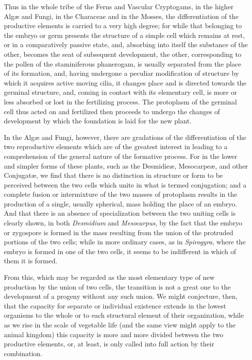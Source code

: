 \documentclass[a4paper, 11pt, oneside, english]{article}
\begin{document}
Thus in the whole tribe of the Ferns and Vascular Cryptogams, in the higher Algæ and Fungi, in the Characeae and in the Mosses, the differentiation of the productive elements is carried to a very high degree; for while that belonging to the embryo or germ presents the structure of a simple cell which remains at rest, or in a comparatively passive state, and, absorbing into itself the substance of the other, becomes the seat of subsequent development, the other, corresponding to the pollen of the staminiferous phanerogam, is usually separated from the place of its formation, and, having undergone a peculiar modification of structure by which it acquires active moving cilia, it changes place and is directed towards the germinal structure, and, coming in contact with its elementary cell, is more or less absorbed or lost in the fertilizing process. The protoplasm of the germinal cell thus acted on and fertilized then proceeds to undergo the changes of development by which the foundation is laid for the new plant.

In the Algæ and Fungi, however, there are gradations of the differentiation of the two reproductive elements which are of the greatest interest in leading to a comprehension of the general nature of the formative process. For in the lower and simpler forms of these plants, such as the Desmidieæ, Mesocarpeæ, and other Conjugatæ, we find that there is no distinction in structure or form to be perceived between the two cells which unite in what is termed conjugation; and a complete fusion or intermixture of the two masses of protoplasm results in the production of a single, usually spherical, mass holding the place of an embryo. And that there is an absence of specialization between the two uniting cells is clearly shown, in both \emph{Desmidium} and \emph{Mesocarpus}, by the fact that the embryo or zygospore is formed in the mass resulting from the union of the protruded portions of the two cells; while in more ordinary cases, as in \emph{Spirogyra}, where the embryo is formed in one of the two cells, it seems to be indifferent in which of them it is formed.

From this, which may be regarded as the most elementary type of new production by the union of two cells, the transition is not a great one to the development of a progeny without any such union. We might conjecture, then, that the capacity for separate or individual existence extends in the lowest organisms to the whole or to each structural element of their organization, while as we rise in the scale of vegetable life (and the same view might apply to the animal kingdom) this capacity is more and more divided between the two productive elements, or, at least, is only called into full action by their combination.
\end{document}
